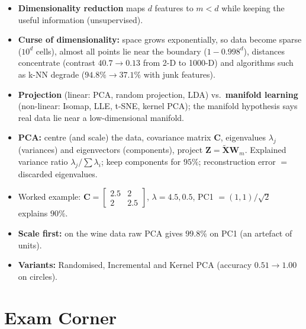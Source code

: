 \begin{summary}
\begin{itemize}
  \item \textbf{Dimensionality reduction} maps $d$ features to $m<d$ while keeping the useful information (unsupervised).
  \item \textbf{Curse of dimensionality:} space grows exponentially, so data become sparse ($10^d$ cells), almost all points lie near the boundary ($1-0.998^d$), distances concentrate (contrast $40.7\to0.13$ from 2-D to 1000-D) and algorithms such as k-NN degrade ($94.8\%\to37.1\%$ with junk features).
  \item \textbf{Projection} (linear: PCA, random projection, LDA) vs.\ \textbf{manifold learning} (non-linear: Isomap, LLE, t-SNE, kernel PCA); the manifold hypothesis says real data lie near a low-dimensional manifold.
  \item \textbf{PCA:} centre (and scale) the data, covariance matrix $\mathbf C$, eigenvalues $\lambda_j$ (variances) and eigenvectors (components), project $\mathbf Z=\tilde{\mathbf X}\mathbf W_m$. Explained variance ratio $\lambda_j/\sum\lambda_i$; keep components for $95\%$; reconstruction error $=$ discarded eigenvalues.
  \item Worked example: $\mathbf C=\begin{bmatrix}2.5&2\\2&2.5\end{bmatrix}$, $\lambda=4.5,0.5$, PC1 $=(1,1)/\sqrt2$ explains $90\%$.
  \item \textbf{Scale first:} on the wine data raw PCA gives $99.8\%$ on PC1 (an artefact of units).
  \item \textbf{Variants:} Randomised, Incremental and Kernel PCA (accuracy $0.51\to1.00$ on circles).
\end{itemize}
\end{summary}

\section*{Exam Corner}

